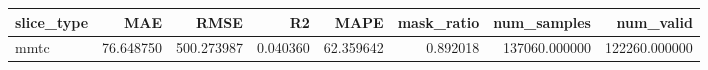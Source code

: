 \begin{tabular}{lrrrrrrr}
\toprule
slice_type & MAE & RMSE & R2 & MAPE & mask_ratio & num_samples & num_valid \\
\midrule
mmtc & 76.648750 & 500.273987 & 0.040360 & 62.359642 & 0.892018 & 137060.000000 & 122260.000000 \\
\bottomrule
\end{tabular}
